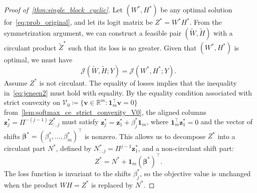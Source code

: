 \documentclass[11pt]{article}
\begin{document}
\begin{proof}[Proof of~\cref{thm:single_block_cyclic}]
Let \((W^*, H^*)\) be any optimal solution for~\cref{eq:prob_original}, and let its logit matrix be \(Z^* = W^*H^*\). From the symmetrization argument, we can construct a feasible pair \((\widetilde{W},\widetilde{H})\) with a circulant product \(\widetilde Z^*\) such that its loss is no greater. Given that \((W^*, H^*)\) is optimal, we must have
\[ \mathcal J(\widetilde{W},\widetilde{H};Y) = \mathcal J(W^*,H^*;Y). \]
Assume \(Z^*\) is not circulant.
The equality of losses implies that the inequality in~\cref{eq:jensen2} must hold with equality. By the equality condition associated with strict convexity on \(\mathcal V_0 \coloneqq \{\boldsymbol v\in\mathbb R^m : \boldsymbol{1}_m^\top \boldsymbol v = 0\}\) from~\cref{lem:softmax_ce_strict_convexity_V0}, the aligned columns \(\boldsymbol{z}^*_j = \Pi^{-(j-1)}Z^*_{:,j}\) must satisfy \(\boldsymbol{z}^*_j = \boldsymbol{z}^*_1 + \beta_j^* \boldsymbol{1}_m\), where \(\boldsymbol{1}_m^\top \boldsymbol{z}^*_1 = 0\) and the vector of shifts \(\boldsymbol{\beta}^* = (\beta_1^*, \ldots, \beta_m^*)^\top\) is nonzero.
This allows us to decompose \(Z^*\) into a circulant part \(N^*\), defined by \(N^*_{:,j}=\Pi^{j-1}\boldsymbol z_1^*\), and a non-circulant shift part:
\[ Z^* = N^* + \boldsymbol{1}_m (\boldsymbol{\beta}^*)^\top. \]
The loss function is invariant to the shifts \(\beta_j^*\), so the objective value is unchanged when the product \(WH=Z^*\) is replaced by \(N^*\).


\end{proof}
\end{document}
